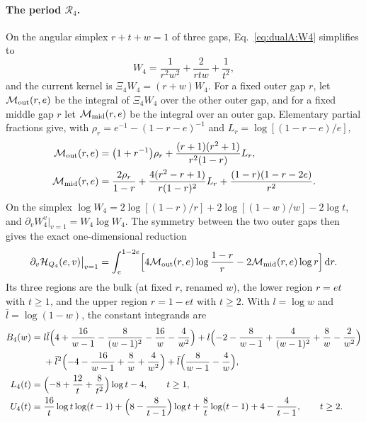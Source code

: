 \documentclass[11pt,a4paper]{article}
\numberwithin{equation}{section}
\newcommand{\dd}{\,\mathrm d}
\begin{document}
\paragraph{The period $\mathcal R_4$.} On the angular simplex $r+t+w=1$ of three gaps, Eq.~\eqref{eq:dualA:W4}
simplifies to
\begin{equation}
 W_4=\frac1{r^2w^2}+\frac2{rtw}+\frac1{t^2},
 \label{eq:dualB:W4decomp}
\end{equation}
and the current kernel is $\Xi_4W_4=(r+w)W_4$. For a fixed outer gap $r$, let $\mathcal M_{\rm out}(r,e)$ be the
integral of $\Xi_4W_4$ over the other outer gap, and for a fixed middle gap $r$ let $\mathcal M_{\rm mid}(r,e)$ be the
integral over an outer gap. Elementary partial fractions give, with $\rho_r=e^{-1}-(1-r-e)^{-1}$ and
$L_r=\log[(1-r-e)/e]$,
\begin{equation}
\begin{aligned}
 \mathcal M_{\rm out}(r,e)&=\bigl(1+r^{-1}\bigr)\rho_r+\frac{(r+1)(r^2+1)}{r^2(1-r)}L_r,\\
 \mathcal M_{\rm mid}(r,e)&=\frac{2\rho_r}{1-r}+\frac{4(r^2-r+1)}{r(1-r)^2}L_r+\frac{(1-r)(1-r-2e)}{r^2}.
\end{aligned}
\label{eq:dualB:Mout}
\end{equation}
On the simplex $\log W_4=2\log[(1-r)/r]+2\log[(1-w)/w]-2\log t$, and $\partial_vW_4^v|_{v=1}=W_4\log W_4$. The symmetry
between the two outer gaps then gives the exact one-dimensional reduction
\begin{equation}
 \partial_v\mathcal H_{Q_4}(e,v)\big|_{v=1}=\int_e^{1-2e}\Bigl[4\mathcal M_{\rm out}(r,e)\log\frac{1-r}{r}
 -2\mathcal M_{\rm mid}(r,e)\log r\Bigr]\dd r.
 \label{eq:dualB:Hprime}
\end{equation}
Its three regions are the bulk (at fixed $r$, renamed $w$), the lower region $r=et$ with $t\ge1$, and the upper region
$r=1-et$ with $t\ge2$. With $l=\log w$ and $\bar l=\log(1-w)$, the constant integrands are
\begin{align}
 B_4(w)={}&l\bar l\Bigl(4+\frac{16}{w-1}-\frac8{(w-1)^2}-\frac{16}{w}-\frac4{w^2}\Bigr)
 +l\Bigl(-2-\frac8{w-1}+\frac4{(w-1)^2}+\frac8w-\frac2{w^2}\Bigr)\notag\\
 &+\bar l^2\Bigl(-4-\frac{16}{w-1}+\frac8w+\frac4{w^2}\Bigr)+\bar l\Bigl(\frac8{w-1}-\frac4w\Bigr),\label{eq:dualB:B4}\\
 L_4(t)={}&\Bigl(-8+\frac{12}{t}+\frac8{t^2}\Bigr)\log t-4,\qquad t\ge1,\\
 U_4(t)={}&\frac{16}{t}\log t\log(t-1)+\Bigl(8-\frac8{t-1}\Bigr)\log t+\frac8t\log(t-1)+4-\frac4{t-1},\qquad t\ge2.
\end{align}
\end{document}
